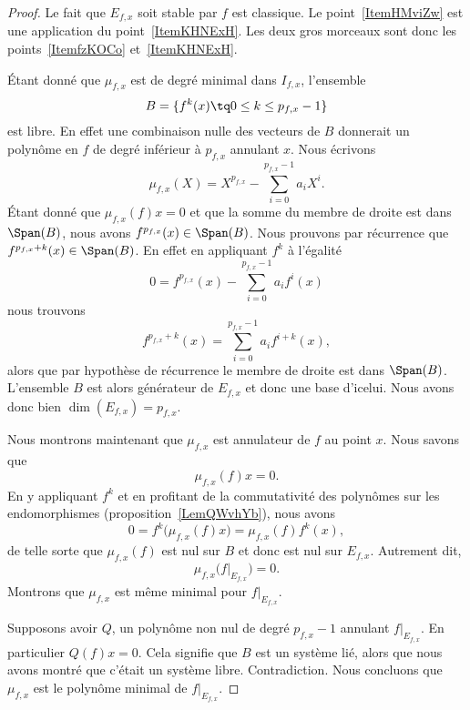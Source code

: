 \begin{proof}
    Le fait que \( E_{f,x}\) soit stable par \( f\) est classique. Le point~\ref{ItemHMviZw} est une application du point~\ref{ItemKHNExH}. Les deux gros morceaux sont donc les points~\ref{ItemfzKOCo} et~\ref{ItemKHNExH}.

    Étant donné que \( \mu_{f,x}\) est de degré minimal dans \( I_{f,x}\), l'ensemble
    \begin{equation}
        B=\{ f^k(x)\tq 0\leq k\leq p_{f,x}-1 \}
    \end{equation}
    est libre. En effet une combinaison nulle des vecteurs de \( B\) donnerait un polynôme en \( f\) de degré inférieur à \( p_{f,x}\) annulant \( x\). Nous écrivons
    \begin{equation}
        \mu_{f,x}(X)=X^{p_{f,x}}-\sum_{i=0}^{p_{f,x}-1}a_iX^i.
    \end{equation}
    Étant donné que \( \mu_{f,x}(f)x=0\) et que la somme du membre de droite est dans \( \Span(B)\), nous avons \( f^{p_{f,x}}(x)\in\Span(B)\). Nous prouvons par récurrence que \( f^{p_{f,x}+k}(x)\in\Span(B)\). En effet en appliquant \( f^k\) à l'égalité
    \begin{equation}
        0=f^{p_{f,x}}(x)-\sum_{i=0}^{p_{f,x}-1}a_if^i(x)
    \end{equation}
    nous trouvons
    \begin{equation}
        f^{p_{f,x}+k}(x)=\sum_{i=0}^{p_{f,x}-1}a_if^{i+k}(x),
    \end{equation}
    alors que par hypothèse de récurrence le membre de droite est dans \( \Span(B)\). L'ensemble \( B\) est alors générateur de \( E_{f,x}\) et donc une base d'icelui. Nous avons donc bien \( \dim(E_{f,x})=p_{f,x}\).

    Nous montrons maintenant que \( \mu_{f,x}\) est annulateur de \( f\) au point \( x\). Nous savons que
    \begin{equation}
        \mu_{f,x}(f)x=0.
    \end{equation}
    En y appliquant \( f^k\) et en profitant de la commutativité des polynômes sur les endomorphismes (proposition~\ref{LemQWvhYb}), nous avons
    \begin{equation}
        0=f^k\big( \mu_{f,x}(f)x \big)=\mu_{f,x}(f)f^k(x),
    \end{equation}
    de telle sorte que \( \mu_{f,x}(f)\) est nul sur \( B\) et donc est nul sur \( E_{f,x}\). Autrement dit,
    \begin{equation}
        \mu_{f,x}\big( f|_{E_{f,x}} \big)=0.
    \end{equation}
    Montrons que \( \mu_{f,x}\) est même minimal pour \( f|_{E_{f,x}}\). 

    Supposons avoir \( Q\), un polynôme non nul de degré \( p_{f,x}-1\) annulant \( f|_{E_{f,x}}\). En particulier \( Q(f)x=0\). Cela signifie que \( B\) est un système lié, alors que nous avons montré que c'était un système libre. Contradiction. Nous concluons que \( \mu_{f,x}\) est le polynôme minimal de \( f|_{E_{f,x}}\).
\end{proof}

